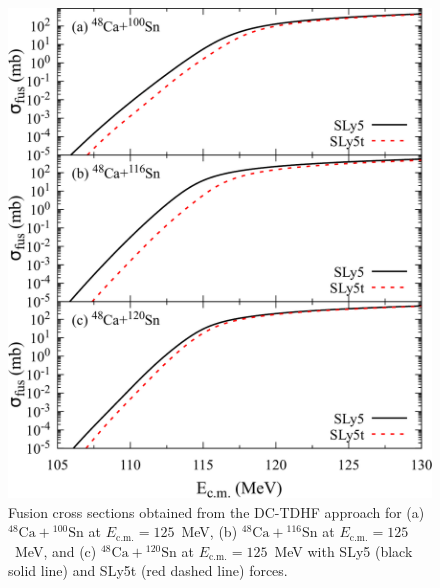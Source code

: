 \begin{figure}
\includegraphics[width=\textwidth]{../Figures/TensorXsec/CrossSections_CaSn.pdf}
\caption{Fusion cross sections obtained from the DC-TDHF approach for (a) $^{48}\mathrm{Ca}+\mathrm{^{100}Sn}$ at $E_{\mathrm{c.m.}}=125$~MeV, (b) $^{48}\mathrm{Ca}+\mathrm{^{116}Sn}$ at $E_{\mathrm{c.m.}}=125$~MeV, and (c) $^{48}\mathrm{Ca}+\mathrm{^{120}Sn}$ at $E_{\mathrm{c.m.}}=125$~MeV with SLy5 (black solid line) and SLy5t (red dashed line) forces.
	\label{Fig:CaSnxsec}}
\end{figure}

